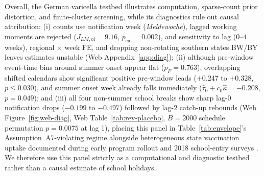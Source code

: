 Overall, the German varicella testbed illustrates computation, sparse-count prior distortion, and
finite-cluster screening, while its diagnostics rule out causal attribution: (i) counts use
notification week (\emph{Meldewoche}), lagged working moments are rejected ($J_{LM,\mathrm{oi}}=9.16$,
$p_{\mathrm{cal}}=0.002$), and sensitivity to lag ($0$--$4$ weeks), regional $\times$ week FE, and
dropping non-rotating southern states BW/BY leaves estimates unstable (Web
Appendix~\ref{app:diag}); (ii) although pre-window event-time bins around summer onset appear flat
($p_F=0.763$), overlapping shifted calendars show significant positive pre-window leads ($+0.247$ to
$+0.328$, $p\le 0.030$), and summer onset week already falls immediately ($\hat\tau_0+c_0\hat\kappa=-0.208$,
$p=0.049$); and (iii) all four non-summer school breaks show sharp lag-0 notification drops
($-0.199$ to $-0.497$) followed by lag-2 catch-up rebounds (Web Figure~\ref{fig:web-diag}, Web
Table~\ref{tab:rev-placebo}, $B=2000$ schedule permutation $p=0.0075$ at lag 1), placing this panel
in Table~\ref{tab:envelope}'s Assumption~A7-violating regime alongside heterogeneous state
vaccination uptake documented during early program rollout and 2018 school-entry surveys
\citep{siedler2010varicella,reuss2010varicella,rieck2020impfquoten}. We therefore use this panel
strictly as a computational and diagnostic testbed rather than a causal estimate of school holidays.
